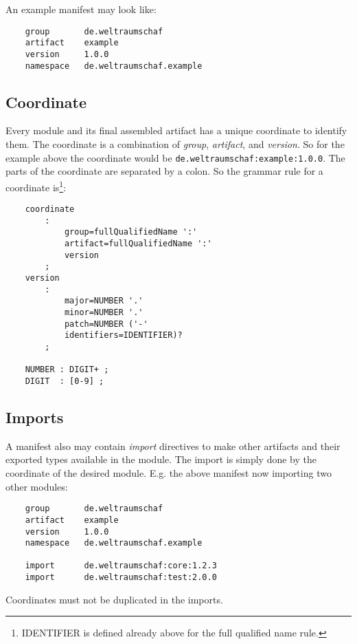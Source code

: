 \documentclass[a4paper,12pt]{report}
\begin{document}
An example manifest may look like:

\begin{verbatim}
    group       de.weltraumschaf
    artifact    example
    version     1.0.0
    namespace   de.weltraumschaf.example
\end{verbatim}

\subsection{Coordinate}

Every module and its final assembled artifact has a unique coordinate to identify them. The coordinate is a combination of \textit{group}, \textit{artifact}, and \textit{version}. So for the example above the coordinate would be \verb|de.weltraumschaf:example:1.0.0|. The parts of the coordinate are separated by a colon. So the grammar rule for a coordinate is\footnote{IDENTIFIER is defined already above for the full qualified name rule.}:

\begin{verbatim}
    coordinate 
        : 
            group=fullQualifiedName ':' 
            artifact=fullQualifiedName ':' 
            version
        ;
    version
        : 
            major=NUMBER '.' 
            minor=NUMBER '.' 
            patch=NUMBER ('-' 
            identifiers=IDENTIFIER)?
        ;
        
    NUMBER : DIGIT+ ;
    DIGIT  : [0-9] ;
\end{verbatim}

\subsection{Imports}

A manifest also may contain \textit{import} directives to make other artifacts and their exported types available in the module. The import is simply done by the coordinate of the desired module. E.g. the above manifest now importing two other modules:

\begin{verbatim}
    group       de.weltraumschaf
    artifact    example
    version     1.0.0
    namespace   de.weltraumschaf.example
    
    import      de.weltraumschaf:core:1.2.3
    import      de.weltraumschaf:test:2.0.0
\end{verbatim}

Coordinates must not be duplicated in the imports.
\end{document}
